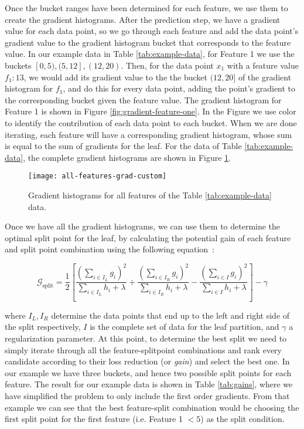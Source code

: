 Once the bucket ranges have been determined for each feature, we use them to create
the gradient histograms. After the prediction step, we have a gradient value for each data point, so
we go through each feature and add the data point's gradient value to the gradient
histogram bucket
that corresponds to the feature value.
In our example data in Table \ref{tab:example-data}, for Feature 1 we use the
buckets $[0, 5), (5, 12], (12, 20)$.
Then, for the data point $x_1$ with a feature value $f_1 : 13$, we would add its
gradient value to the
the bucket $(12, 20]$ of the gradient histogram for $f_1$, and do this for
every data point, adding the point's gradient to the corresponding bucket given
the feature value. The gradient histogram for Feature 1 is shown in Figure \ref{fig:gradient-feature-one}. In the Figure we use color to identify the
contribution of each data point to each bucket.
When we are done iterating, each feature will have a corresponding gradient histogram,
whose sum is equal to the sum of gradients for the leaf.
For the data of Table \ref{tab:example-data}, the complete gradient histograms
are shown in Figure \ref{fig:gradient-all-features}.

\begin{figure}
	\centering
	\texttt{[image: all-features-grad-custom]}
	\caption{Gradient histograms for all features of the Table \ref{tab:example-data} data.
		}
	\label{fig:gradient-all-features}
\end{figure}

Once we have all the gradient histograms, we can use them to determine the optimal split point for the
leaf, by calculating the potential gain of each feature and split point combination using the following equation~\cite{xgboost}:

\begin{equation}
	\mathcal{G}_{\text{split}} = \frac{1}{2} \left[\frac{\left(\sum_{i \in I_{L}} g_{i} \right)^{2}} {\sum_{i \in I_{L}} h_{i}+ \lambda} + \frac{\left(\sum_{i \in I_{R}} g_{i} \right)^{2}}{\sum_{i \in I_{R}} h_{i} + \lambda} - \frac{\left(\sum_{i \in I}g_{i}\right)^{2}}{\sum_{i \in I}h_{i}+\lambda}\right]-\gamma
\end{equation}

\noindent
where $I_L, I_R$ determine the data points that end up to the left and right side of the split
respectively, $I$ is the complete set of data for the leaf partition, and $\gamma$ a
regularization parameter. At this point, to determine
the best split we need to simply iterate through all the feature-splitpoint combinations
and rank every candidate according to their loss reduction (or \textit{gain}) and select the
best one. In our example we have three buckets, and hence two possible split points for each feature. The result for our example data is shown in Table \ref{tab:gains}, where
we have simplified the problem to only include the first order gradients. From that example
we can see that the best feature-split combination would be choosing the first split
point for the first feature (i.e. Feature 1 $< 5$) as the split condition.

